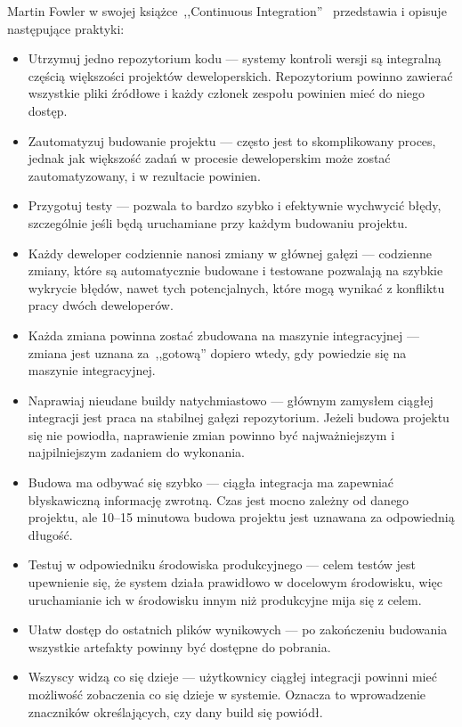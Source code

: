 \documentclass[twoside,a4paper]{report}
\begin{document}
Martin Fowler w swojej książce~,,Continuous Integration''~\cite{fowler2006continuous} przedstawia i opisuje następujące praktyki:
\begin{itemize}[noitemsep,topsep=0pt]
    \item Utrzymuj jedno repozytorium kodu --- systemy kontroli wersji są integralną częścią większości projektów deweloperskich. Repozytorium powinno zawierać wszystkie pliki źródłowe i każdy członek zespołu powinien mieć do niego dostęp.
    \item Zautomatyzuj budowanie projektu --- często jest to skomplikowany proces, jednak jak większość zadań w procesie deweloperskim może zostać zautomatyzowany, i w rezultacie powinien.
    \item Przygotuj testy --- pozwala to bardzo szybko i efektywnie wychwycić błędy, szczególnie jeśli będą uruchamiane przy każdym budowaniu projektu.
    \item Każdy deweloper codziennie nanosi zmiany w głównej gałęzi --- codzienne zmiany, które są automatycznie budowane i testowane pozwalają na szybkie wykrycie błędów, nawet tych potencjalnych, które mogą wynikać z konfliktu pracy dwóch deweloperów.
    \item Każda zmiana powinna zostać zbudowana na maszynie integracyjnej --- zmiana jest uznana za~,,gotową'' dopiero wtedy, gdy powiedzie się na maszynie integracyjnej.
    \item Naprawiaj nieudane buildy natychmiastowo --- głównym zamysłem ciągłej integracji jest praca na stabilnej gałęzi repozytorium. Jeżeli budowa projektu się nie powiodła, naprawienie zmian powinno być najważniejszym i najpilniejszym zadaniem do wykonania.
    \item Budowa ma odbywać się szybko --- ciągła integracja ma zapewniać błyskawiczną informację zwrotną. Czas jest mocno zależny od danego projektu, ale 10--15 minutowa budowa projektu jest uznawana za odpowiednią długość.
    \item Testuj w odpowiedniku środowiska produkcyjnego --- celem testów jest upewnienie się, że system działa prawidłowo w docelowym środowisku, więc uruchamianie ich w środowisku innym niż produkcyjne mija się z celem.
    \item Ułatw dostęp do ostatnich plików wynikowych --- po zakończeniu budowania wszystkie artefakty powinny być dostępne do pobrania.
    \item Wszyscy widzą co się dzieje --- użytkownicy ciągłej integracji powinni mieć możliwość zobaczenia co się dzieje w systemie. Oznacza to wprowadzenie znaczników określających, czy dany build się powiódł.
\end{itemize}
\end{document}
